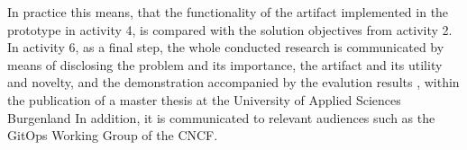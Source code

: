 In practice this means, that
the functionality of the artifact implemented in the prototype in activity 4,
is compared with the solution objectives from activity 2.
%
In activity 6, as a final step,
the whole conducted research is communicated by means of
disclosing
the problem and its importance,
the artifact and its utility and novelty,
and the demonstration accompanied by the evalution results
\autocite{designScienceResearchMethodologyForInformationSystemsResearch},
within the publication of a master thesis at
the University of Applied Sciences Burgenland
In addition, it is communicated to relevant audiences such as
the GitOps Working Group
of the CNCF.




















%
%
%
%
%
%
%

